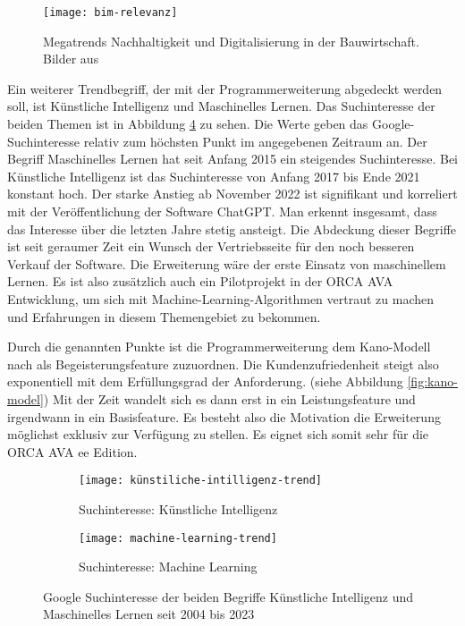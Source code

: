 \begin{figure}[h]
	\centering
	\texttt{[image: bim-relevanz]}
	\caption[Relevanz \ac{bim}]
	{Megatrends Nachhaltigkeit und Digitalisierung in der Bauwirtschaft. Bilder aus \citep[p.~20]{Thomas_Baumanns_Dr_Philipp-Stephan_Freber_Dr_Kai-Stefan_Schober_Dr_Florian_Kirchner2016-gu}}
	\label{fig:bim}
\end{figure}
Ein weiterer Trendbegriff, der mit der Programmerweiterung abgedeckt werden soll, ist \glqq Künstliche Intelligenz\grqq{} und \glqq Maschinelles Lernen\grqq{}. Das Suchinteresse der beiden Themen ist in Abbildung \ref{fig:ki-ml-trend} zu sehen. Die Werte geben das Google-Suchinteresse relativ zum höchsten Punkt im angegebenen Zeitraum an. Der Begriff \glqq Maschinelles Lernen\grqq{} hat seit Anfang 2015 ein steigendes Suchinteresse. Bei \glqq Künstliche Intelligenz\grqq{} ist das Suchinteresse von Anfang 2017 bis Ende 2021 konstant hoch. Der starke Anstieg ab November 2022 ist signifikant und korreliert mit der Veröffentlichung der Software ChatGPT. Man erkennt insgesamt, dass das Interesse über die letzten Jahre stetig ansteigt. Die Abdeckung dieser Begriffe ist seit geraumer Zeit ein Wunsch der Vertriebsseite für den noch besseren Verkauf der Software. Die Erweiterung wäre der erste Einsatz von maschinellem Lernen. Es ist also zusätzlich auch ein Pilotprojekt in der ORCA AVA Entwicklung, um sich mit Machine-Learning-Algorithmen vertraut zu machen und Erfahrungen in diesem Themengebiet zu bekommen.

Durch die genannten Punkte ist die Programmerweiterung dem Kano-Modell nach als Begeisterungsfeature zuzuordnen. Die Kundenzufriedenheit steigt also exponentiell mit dem Erfüllungsgrad der Anforderung. (siehe Abbildung \ref{fig:kano-model}) Mit der Zeit wandelt sich es dann erst in ein Leistungsfeature und irgendwann in ein Basisfeature. \citep[p.~3-4]{Hölzing_2008} Es besteht also die Motivation die Erweiterung möglichst exklusiv zur Verfügung zu stellen. Es eignet sich somit sehr für die ORCA AVA \ac{ee} Edition.

\begin{figure}[tb]
	\centering
	
	\begin{subfigure}{0.99\textwidth}
		\centering
	\texttt{[image: künstiliche-intilligenz-trend]}
		\caption{Suchinteresse: Künstliche Intelligenz}
		\label{FIG:ki-trend}
	\end{subfigure}
	\hspace{1cm}
	\begin{subfigure}{0.99\textwidth}
		\centering
	\texttt{[image: machine-learning-trend]}
		\caption{Suchinteresse: Machine Learning}
		\label{FIG:ml-trend}
	\end{subfigure}
	
	\caption[Google Trends]{Google Suchinteresse der beiden Begriffe \glqq Künstliche Intelligenz\grqq{} und \glqq Maschinelles Lernen{} seit 2004 bis 2023}
	\label{fig:ki-ml-trend}
\end{figure}

